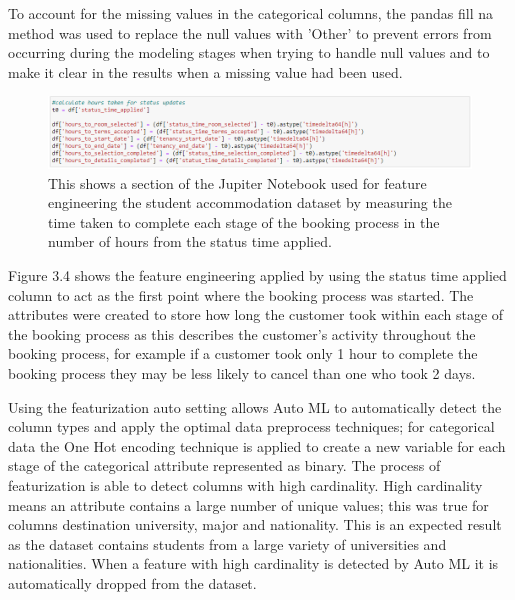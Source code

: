 \vspace{5mm}

To account for the missing values in the categorical columns, the pandas fill na method was used to replace the null values with 'Other'  to prevent errors from occurring during the modeling stages when trying to handle null values and to make it clear in the results when a missing value had been used.

\begin{figure}[H]
 \centering
 \includegraphics[width=15cm]{figures/time_variables.png}
 \caption{This shows a section of the Jupiter Notebook used for feature engineering the student accommodation dataset by measuring the time taken to complete each stage of the booking process in the number of hours from the status time applied.}
\end{figure}
Figure 3.4 shows the feature engineering applied by using the status time applied column to act as the first point where the booking process was started. The attributes were created to store how long the customer took within each stage of the booking process as this describes the customer's activity throughout the booking process, for example if a customer took only 1 hour to complete the booking process they may be less likely to cancel than one who took 2 days. 

\vspace{5mm}

Using the featurization auto setting allows Auto ML to automatically detect the column types and apply the optimal data preprocess techniques; for categorical data the One Hot encoding technique is applied to create a new variable for each stage of the categorical attribute represented as binary. The process of featurization is able to detect columns with high cardinality. High cardinality means an attribute contains a large number of unique values; this was true for columns destination university, major and nationality. This is an expected result as the dataset contains students from a large variety of universities and nationalities. When a feature with high cardinality is detected by Auto ML it is automatically dropped from the dataset. 

\vspace{5mm}

